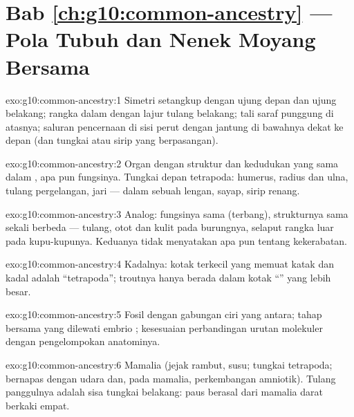 \section*{Bab \ref{ch:g10:common-ancestry} --- Pola Tubuh dan Nenek Moyang Bersama}

\begin{solution}{exo:g10:common-ancestry:1}
Simetri setangkup dengan ujung depan dan ujung belakang; rangka dalam
dengan lajur tulang belakang; tali saraf punggung di atasnya; saluran
pencernaan di sisi perut dengan jantung di bawahnya dekat ke depan
(dan tungkai atau sirip yang berpasangan).
\end{solution}

\begin{solution}{exo:g10:common-ancestry:2}
Organ dengan struktur dan kedudukan yang sama dalam , apa
pun fungsinya. Tungkai depan tetrapoda: humerus, radius dan ulna,
tulang pergelangan, jari --- dalam sebuah lengan, sayap, sirip renang.
\end{solution}

\begin{solution}{exo:g10:common-ancestry:3}
Analog: fungsinya sama (terbang), strukturnya sama sekali berbeda ---
tulang, otot dan kulit pada burungnya, selaput rangka luar pada
kupu-kupunya. Keduanya tidak menyatakan apa pun tentang kekerabatan.
\end{solution}

\begin{solution}{exo:g10:common-ancestry:4}
Kadalnya: kotak terkecil yang memuat katak dan kadal adalah
``tetrapoda''; troutnya hanya berada dalam kotak ``'' yang lebih besar.
\end{solution}

\begin{solution}{exo:g10:common-ancestry:5}
Fosil dengan gabungan ciri yang antara; tahap bersama yang dilewati
embrio ; kesesuaian perbandingan urutan molekuler dengan
pengelompokan anatominya.
\end{solution}

\begin{solution}{exo:g10:common-ancestry:6}
Mamalia (jejak rambut, susu; tungkai tetrapoda; bernapas dengan udara
dan, pada mamalia, perkembangan amniotik). Tulang panggulnya adalah
sisa tungkai belakang: paus berasal dari mamalia darat berkaki empat.
\end{solution}

